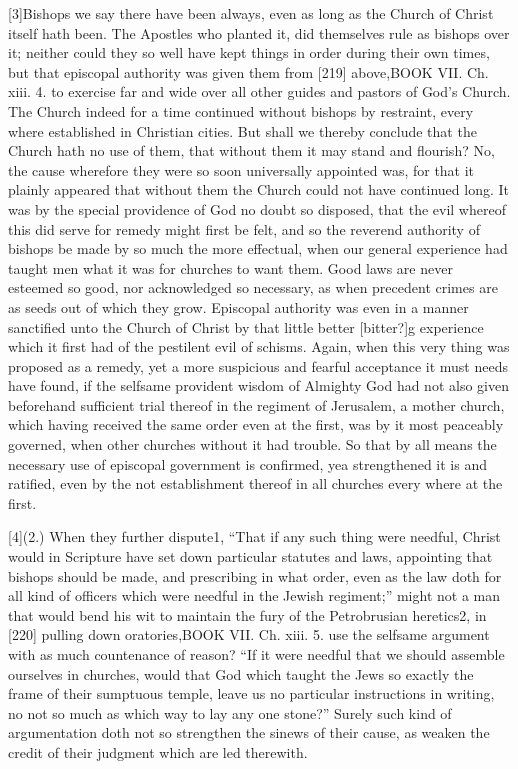 [3]Bishops we say there have been always, even as long as the Church of Christ itself hath been. The Apostles who planted it, did themselves rule as bishops over it; neither could they so well have kept things in order during their own times, but that episcopal authority was given them from [219] above,BOOK VII. Ch. xiii. 4. to exercise far and wide over all other guides and pastors of God’s Church. The Church indeed for a time continued without bishops by restraint, every where established in Christian cities. But shall we thereby conclude that the Church hath no use of them, that without them it may stand and flourish? No, the cause wherefore they were so soon universally appointed was, for that it plainly appeared that without them the Church could not have continued long. It was by the special providence of God no doubt so disposed, that the evil whereof this did serve for remedy might first be felt, and so the reverend authority of bishops be made by so much the more effectual, when our general experience had taught men what it was for churches to want them. Good laws are never esteemed so good, nor acknowledged so necessary, as when precedent crimes are as seeds out of which they grow. Episcopal authority was even in a manner sanctified unto the Church of Christ by that little better [bitter?]g experience which it first had of the pestilent evil of schisms. Again, when this very thing was proposed as a remedy, yet a more suspicious and fearful acceptance it must needs have found, if the selfsame provident wisdom of Almighty God had not also given beforehand sufficient trial thereof in the regiment of Jerusalem, a mother church, which having received the same order even at the first, was by it most peaceably governed, when other churches without it had trouble. So that by all means the necessary use of episcopal government is confirmed, yea strengthened it is and ratified, even by the not establishment thereof in all churches every where at the first.

[4](2.) When they further dispute1, “That if any such thing were needful, Christ would in Scripture have set down particular statutes and laws, appointing that bishops should be made, and prescribing in what order, even as the law doth for all kind of officers which were needful in the Jewish regiment;” might not a man that would bend his wit to maintain the fury of the Petrobrusian heretics2, in [220] pulling down oratories,BOOK VII. Ch. xiii. 5. use the selfsame argument with as much countenance of reason? “If it were needful that we should assemble ourselves in churches, would that God which taught the Jews so exactly the frame of their sumptuous temple, leave us no particular instructions in writing, no not so much as which way to lay any one stone?” Surely such kind of argumentation doth not so strengthen the sinews of their cause, as weaken the credit of their judgment which are led therewith.

